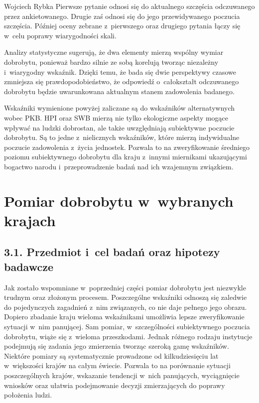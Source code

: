 \begin{artplenv}{Wojciech Rybka}
Pierwsze pytanie odnosi się do aktualnego szczęścia odczuwanego przez ankietowanego. Drugie zaś odnosi się do jego
przewidywanego poczucia szczęścia. Później oceny zebrane z~pierwszego oraz drugiego pytania łączy się w~celu poprawy
wiarygodności skali. 

Analizy statystyczne sugerują, że dwa elementy mierzą wspólny wymiar dobrobytu, ponieważ bardzo silnie ze sobą korelują
tworząc niezależny i~wiarygodny wskaźnik. Dzięki temu, że bada się dwie perspektywy czasowe zmniejsza się
prawdopodobieństwo, że odpowiedź o~całokształt odczuwanego dobrobytu będzie uwarunkowana aktualnym stanem zadowolenia
badanego.


Wskaźniki wymienione powyżej zaliczane są do wskaźników alternatywnych wobec PKB. HPI oraz SWB mierzą nie tylko
ekologiczne aspekty mogące wpływać na ludzki dobrostan, ale także uwzględniają subiektywne poczucie dobrobytu. Są to
jedne z~nielicznych wskaźników, które mierzą indywidualne poczucie zadowolenia z~życia jednostek. Pozwala to na
zweryfikowanie średniego poziomu subiektywnego dobrobytu dla kraju z~innymi miernikami ukazującymi bogactwo
narodu i~przeprowadzenie badań nad ich wzajemnym związkiem. 

\section{Pomiar dobrobytu w~wybranych krajach}
\baselineskip
\subsection{3.1. Przedmiot i~cel badań oraz hipotezy badawcze}
Jak zostało wspomniane w~poprzedniej części pomiar dobrobytu jest niezwykle trudnym oraz złożonym procesem. Poszczególne
wskaźniki odnoszą się zaledwie do pojedynczych zagadnień z~nim związanych, co nie daje pełnego jego obrazu. Dopiero
zbadanie kraju wieloma wskaźnikami umożliwia lepsze zweryfikowanie sytuacji w~nim panującej.
Sam pomiar, w~szczególności subiektywnego poczucia dobrobytu, wiąże się z~wieloma przeszkodami.
Jednak różnego rodzaju instytucje
podejmują się zadania jego zmierzenia tworząc szeroką gamę wskaźników. Niektóre pomiary są systematycznie prowadzone od
kilkudziesięciu lat w~większości krajów na całym świecie. Pozwala to na porównanie sytuacji poszczególnych krajów,
wskazanie tendencji w~nich panujących, wyciągnięcie wniosków oraz ułatwia podejmowanie decyzji zmierzających do poprawy
położenia ludzi. 


\end{artplenv}
